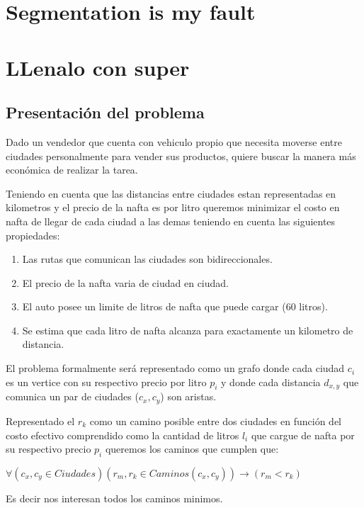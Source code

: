 \documentclass[12pt]{article}
\begin{document}
\section{Segmentation is my fault}


\section{LLenalo con super}

\subsection*{Presentación del problema}
Dado un vendedor que cuenta con vehiculo propio que necesita moverse entre ciudades personalmente para vender sus productos, quiere buscar la manera más económica de realizar la tarea.

Teniendo en cuenta que las distancias entre ciudades estan representadas en kilometros y el precio de la nafta es por litro queremos minimizar el costo en nafta de llegar de cada ciudad a las demas teniendo en cuenta las siguientes propiedades: 

\begin{enumerate}
    \item Las rutas que comunican las ciudades son bidireccionales.
    \item El precio de la nafta varia de ciudad en ciudad.
    \item El auto posee un limite de litros de nafta que puede cargar (60 litros).
    \item Se estima que cada litro de nafta alcanza para exactamente un kilometro de distancia.
\end{enumerate}

El problema formalmente será representado como un grafo donde cada ciudad
 $c_i$ es un vertice con su respectivo precio por litro $p_i$ y donde 
 cada distancia $d_{x,y}$ que comunica un par de ciudades ($c_x, c_y$) son aristas.

Representado el $r_k$ como un camino posible entre dos ciudades en función del costo efectivo
comprendido como la cantidad de litros $l_i$ que cargue de nafta por su respectivo precio $p_i$ queremos los caminos que cumplen que:

$\forall(c_x, c_y \in Ciudades)(r_{m}, r_k \in Caminos(c_x,c_y))\rightarrow(r_{m} < r_k)$

Es decir nos interesan todos los caminos minimos.
\end{document}
